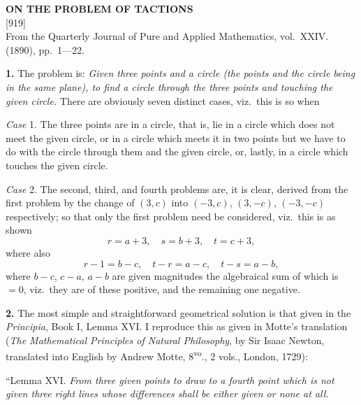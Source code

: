 \documentclass[11pt,a4paper]{article}
\newcommand{\paper}[4]{%
  \newpage
  \begin{center}
    {\large\bfseries #2}\\[0.5em]
    {\small [#1]}\\[0.3em]
    {\small #3}
  \end{center}
  \vspace{0.5em}
}
\begin{document}
\setcounter{page}{151}

\paper{919}{ON THE PROBLEM OF TACTIONS}{From the Quarterly Journal of Pure and Applied Mathematics, vol.~XXIV. (1890), pp.~1---22.}{}

\textbf{1.} The problem is: \textit{Given three points and a circle (the points and the circle being in the same plane), to find a circle through the three points and touching the given circle.} There are obviously seven distinct cases, viz.\ this is so when

\textit{Case} 1. The three points are in a circle, that is, lie in a circle which does not meet the given circle, or in a circle which meets it in two points but we have to do with the circle through them and the given circle, or, lastly, in a circle which touches the given circle.

\textit{Case} 2. The second, third, and fourth problems are, it is clear, derived from the first problem by the change of $(3,c)$ into $(-3,c)$, $(3,-c)$, $(-3,-c)$ respectively; so that only the first problem need be considered, viz.\ this is as shown
\[
r = a + 3, \quad s = b + 3, \quad t = c + 3,
\]
where also
\[
r - 1 = b - c, \quad t - r = a - c, \quad t - s = a - b,
\]
where $b - c$, $c - a$, $a - b$ are given magnitudes the algebraical sum of which is $= 0$, viz.\ they are of these positive, and the remaining one negative.

\textbf{2.} The most simple and straightforward geometrical solution is that given in the \textit{Principia}, Book I, Lemma XVI. I reproduce this as given in Motte's translation (\textit{The Mathematical Principles of Natural Philosophy}, by Sir Isaac Newton, translated into English by Andrew Motte, 8\textsuperscript{vo}., 2 vols., London, 1729):

``Lemma XVI. \textit{From three given points to draw to a fourth point which is not given three right lines whose differences shall be either given or none at all.}
\end{document}

